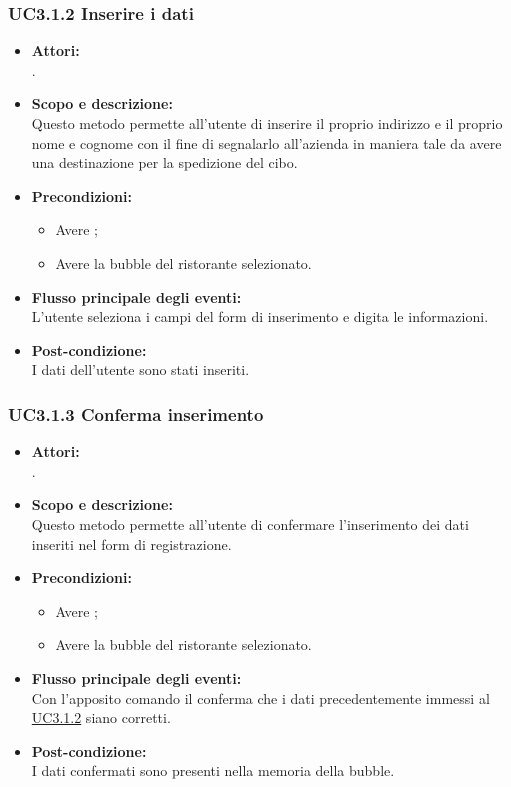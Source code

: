 \subsubsection{UC3.1.2 Inserire i dati} \label{UC3.1.2}

\begin{itemize}
	\item \textbf{Attori:}
	\\.
	\item \textbf{Scopo e descrizione:} 
	\\Questo metodo permette all’utente di inserire il proprio indirizzo e il proprio nome e cognome con il fine di segnalarlo all’azienda in maniera tale da avere una destinazione per la spedizione del cibo.
	\item \textbf{Precondizioni:}
	\begin{itemize}
		\item Avere ;
		\item Avere la bubble del ristorante selezionato.
	\end{itemize}
	\item \textbf{Flusso principale degli eventi:}
	\\L'utente seleziona i campi del form di inserimento e digita le informazioni.
	\item \textbf{Post-condizione:}
	\\I dati dell’utente sono stati inseriti.
\end{itemize}

\subsubsection{UC3.1.3 Conferma inserimento} \label{UC3.1.3}

\begin{itemize}
	\item \textbf{Attori:}
	\\.
	\item \textbf{Scopo e descrizione:} 
	\\Questo metodo permette all’utente di confermare l’inserimento dei dati inseriti nel form di registrazione.
	\item \textbf{Precondizioni:}
	\begin{itemize}
		\item Avere ;
		\item Avere la bubble del ristorante selezionato.
	\end{itemize}
	\item \textbf{Flusso principale degli eventi:}
	\\Con l’apposito comando il  conferma che i dati precedentemente immessi al  \hyperref[UC3.1.2]{UC3.1.2} siano corretti.
	\item \textbf{Post-condizione:}
	\\I dati confermati sono presenti nella memoria della bubble.
\end{itemize}


